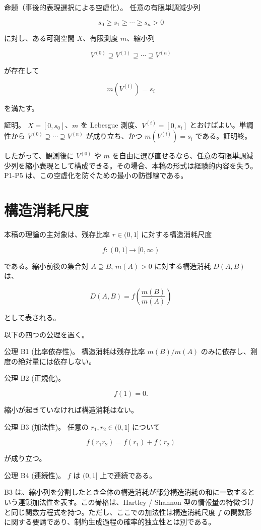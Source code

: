 \documentclass[12pt,a4paper]{article}
\begin{document}
命題（事後的表現選択による空虚化）。 任意の有限単調減少列

\[
s_0 \ge s_1 \ge \cdots \ge s_{n} > 0
\]

に対し、ある可測空間 \(X\)、有限測度 \(m\)、縮小列

\[
V^{(0)} \supseteq V^{(1)} \supseteq \cdots \supseteq V^{(n)}
\]

が存在して

\[
m(V^{(i)}) = s_{i}
\]

を満たす。

証明。 \(X=[0,s_0]\)、\(m\) を Lebesgue 測度、\(V^{(i)}=[0,s_{i}]\) とおけばよい。単調性から \(V^{(0)} \supseteq \cdots \supseteq V^{(n)}\) が成り立ち、かつ \(m(V^{(i)})=s_{i}\) である。証明終。

したがって、観測後に \(V^{(0)}\) や \(m\) を自由に選び直せるなら、任意の有限単調減少列を縮小表現として構成できる。その場合、本稿の形式は経験的内容を失う。P1-P5 は、この空虚化を防ぐための最小の防御線である。

\section{構造消耗尺度}\label{ux69cbux9020ux6d88ux8017ux5c3aux5ea6}

本稿の理論の主対象は、残存比率 \(r \in (0,1]\) に対する構造消耗尺度

\[
f : (0,1] \to [0,\infty)
\]

である。縮小前後の集合対 \(A \supseteq B\), \(m(A)>0\) に対する構造消耗 \(D(A,B)\) は、

\[
D(A,B) = f\left(\frac{m(B)}{m(A)}\right)
\]

として表される。

以下の四つの公理を置く。

公理 B1 (比率依存性)。 構造消耗は残存比率 \(m(B)/m(A)\) のみに依存し、測度の絶対量には依存しない。

公理 B2 (正規化)。

\[
f(1)=0.
\]

縮小が起きていなければ構造消耗はない。

公理 B3 (加法性)。 任意の \(r_1,r_2\in(0,1]\) について

\[
f(r_1r_2)=f(r_1)+f(r_2)
\]

が成り立つ。

公理 B4 (連続性)。 \(f\) は \((0,1]\) 上で連続である。

B3 は、縮小列を分割したとき全体の構造消耗が部分構造消耗の和に一致するという連鎖加法性を表す。この骨格は、Hartley / Shannon 型の情報量の特徴づけと同じ関数方程式を持つ。ただし、ここでの加法性は構造消耗尺度 \(f\) の関数形に関する要請であり、制約生成過程の確率的独立性とは別である。
\end{document}
